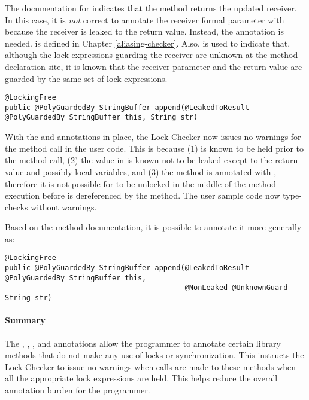 The documentation for 
indicates that the method returns the updated receiver.  In this case,
it is \emph{not} correct to annotate the receiver formal parameter with
 because the receiver is leaked to the
return value.  Instead, the  annotation is needed.
 is defined
in Chapter \ref{aliasing-checker}.  Also,  is used
to indicate that, although the lock expressions guarding the receiver
are unknown at the method declaration site, it is known that the receiver
parameter and the return value are guarded by the same set of lock expressions.

\begin{verbatim}
@LockingFree
public @PolyGuardedBy StringBuffer append(@LeakedToResult @PolyGuardedBy StringBuffer this, String str)
\end{verbatim}

With the  and  annotations in place, the
Lock Checker now issues no warnings for the 
method call in the user code.  This is because (1) 
is known to be held prior to the method call, (2) the
value in  is known not to be leaked except to the return
value and possibly local variables, and (3) the method
is annotated with , therefore it is not possible
for  to be unlocked in the middle of the method execution
before  is dereferenced by the method.  The
user sample code now type-checks without warnings.

Based on the method documentation, it is possible to annotate it more generally as:

\begin{verbatim}
@LockingFree
public @PolyGuardedBy StringBuffer append(@LeakedToResult @PolyGuardedBy StringBuffer this,
                                          @NonLeaked @UnknownGuard String str)
\end{verbatim}

\paragraph{Summary\label{lock-checker-library-methods-summary}}

The , ,
,  and  annotations allow the programmer
to annotate certain library methods that do not make any use of
locks or synchronization.  This instructs the Lock Checker to issue no
warnings when calls are made to these methods when all the
appropriate lock expressions are held.  This helps reduce the
overall annotation burden for the programmer.


